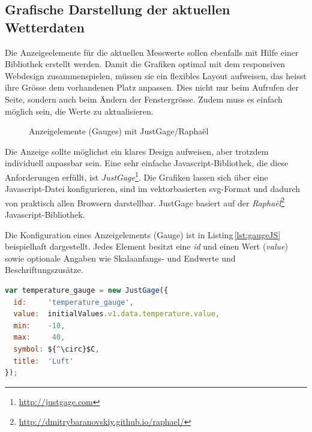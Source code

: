 \subsection{Grafische Darstellung der aktuellen Wetterdaten}
Die Anzeigeelemente für die aktuellen Messwerte sollen ebenfalls mit Hilfe einer Bibliothek erstellt werden. Damit die Grafiken optimal mit dem responsiven Webdesign zusammenspielen, müssen sie ein flexibles Layout aufweisen, das heisst ihre Grösse dem vorhandenen Platz anpassen. Dies nicht nur beim Aufrufen der Seite, sondern auch beim Ändern der Fenstergrösse. Zudem muss es einfach möglich sein, die Werte zu aktualisieren.

\begin{figure}[h!]
	\centering
	\caption{Anzeigelemente (Gauges) mit JustGage/Raphaël}
	\label{img:gauges}
\end{figure}

\noindent
Die Anzeige sollte möglichst ein klares Design aufweisen, aber trotzdem individuell anpassbar sein. Eine sehr einfache Javascript-Bibliothek, die diese Anforderungen erfüllt, ist \emph{JustGage}\footnote{ \url{http://justgage.com}}. Die Grafiken lassen sich über eine Javascript-Datei konfigurieren, sind im vektorbasierten svg-Format und dadurch von praktisch allen Browsern darstellbar. JustGage basiert auf der \textit{Raphaël}\footnote{ \url{http://dmitrybaranovskiy.github.io/raphael/}} Javascript-Bibliothek.

\noindent
Die Konfiguration eines Anzeigelements (Gauge) ist in Listing\,\ref{lst:gaugeJS} beispielhaft dargestellt. Jedes Element besitzt eine \emph{id} und einen Wert (\emph{value}) sowie optionale Angaben wie Skalaanfangs- und Endwerte und Beschriftungszusätze.

\vspace{3mm}
\begin{lstlisting}[label=lst:gaugeJS,caption=Konfiguration einer Gauge in Javascript, language=JavaScript, mathescape, style=htmlcssjs]
var temperature_gauge = new JustGage({
  id:     'temperature_gauge',
  value:  initialValues.v1.data.temperature.value,
  min:    -10,
  max:     40,
  symbol: ${^\circ}$C,
  title:  'Luft'
});
\end{lstlisting}
\vspace{3mm}

